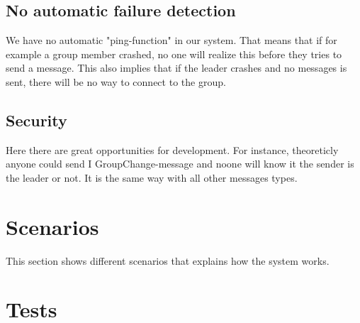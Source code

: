 \documentclass[titlepage, twocolumn, a4paper, 10pt]{article}
\begin{document}
\subsection{No automatic failure detection}\label{sec:no-automatic-failure-detection}
We have no automatic "ping-function" in our system. That means that if for example
a group member crashed, no one will realize this before they tries to send a message. This also
implies that if the leader crashes and no messages is sent, there will be no way to connect to the group.

\subsection{Security}\label{sec:security}
Here there are great opportunities for development. For instance, theoreticly anyone could send I 
GroupChange-message and noone will know it the sender is the leader or not. It is the same way 
with all other messages types.

\section{Scenarios}\label{sec:scenarios}
This section shows different scenarios that explains how the system
works.


\section{Tests}\label{sec:tests}





%
%
\end{document}
